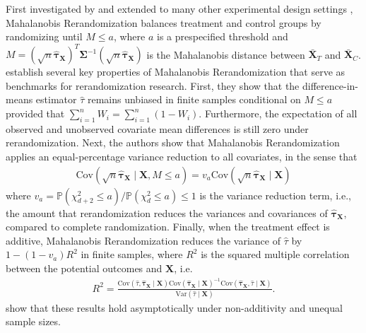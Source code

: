 \documentclass[11pt,twoside]{article}
\theoremstyle{definition}
\theoremstyle{remark}
\begin{document}
First investigated by \cite{morgan2012rerandomization} and extended to many other experimental design settings \citep{morgan2015rerandomization, branson2016improving, li2020rerandomization_2k, li2020rerandomization_regression, zhou2018sequential, wang2022rerandomization, shi2022rerandomization, lu2023design, wang2023rerandomization}, Mahalanobis Rerandomization balances treatment and control groups by randomizing until $M \leq a$, where $a$ is a prespecified threshold and $M = ( \sqrt{n}\widehat{\bm{\tau}}_{\mathbf{X}})^T \mathbf{\Sigma}^{-1} ( \sqrt{n}\widehat{\bm{\tau}}_{\mathbf{X}}) $ is the Mahalanobis distance between $\bar{\mathbf{X}}_T$ and $\bar{\mathbf{X}}_C$. \cite{morgan2012rerandomization} establish several key properties of Mahalanobis Rerandomization that serve as benchmarks for rerandomization research. First, they show that the difference-in-means estimator $\widehat{\tau}$ remains unbiased in finite samples conditional on $M \leq a$ provided that $\sum^n_{i=1} W_i = \sum^n_{i=1} (1 - W_i)$. Furthermore, the expectation of all observed and unobserved covariate mean differences is still zero under rerandomization. Next, the authors show that Mahalanobis Rerandomization applies an equal-percentage variance reduction to all covariates, in the sense that
\begin{align*}
    \text{Cov}(\sqrt{n}\widehat{\bm{\tau}}_{\mathbf{X}} \mid \mathbf{X}, M \leq a ) = v_a \text{Cov}( \sqrt{n}\widehat{\bm{\tau}}_{\mathbf{X}} \mid \mathbf{X})
\end{align*}
where $v_a = \mathbb{P}(\chi^2_{d+2} \leq a) / \mathbb{P}(\chi^2_d \leq a) \leq 1$ is the variance reduction term, i.e., the amount that rerandomization reduces the variances and covariances of $\widehat{\bm{\tau}}_{\mathbf{X}}$, compared to complete randomization. Finally, when the treatment effect is additive, Mahalanobis Rerandomization reduces the variance of $\widehat{\tau}$ by $1 - (1-v_a)R^2$ in finite samples, where $R^2$ is the squared multiple correlation between the potential outcomes and $\mathbf{X}$, i.e.
\begin{align*}
    R^2 = \frac{\text{Cov}(\widehat{\tau}, \widehat{\bm{\tau}}_{\mathbf{X}} \mid \mathbf{X}) \text{Cov}(\widehat{\bm{\tau}}_{\mathbf{X}} \mid \mathbf{X})^{-1} \text{Cov}(\widehat{\bm{\tau}}_{\mathbf{X}}, \widehat{\tau} \mid \mathbf{X})}{\text{Var}(\widehat{\tau} \mid \mathbf{X})}.
\end{align*}
\cite{li2018asymptotic} show that these results hold asymptotically under non-additivity and unequal sample sizes.
\end{document}
